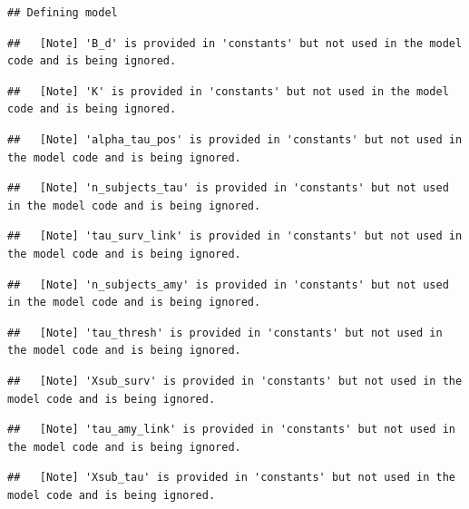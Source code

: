 \documentclass[
]{article}
\begin{document}
\begin{verbatim}
## Defining model
\end{verbatim}

\begin{verbatim}
##   [Note] 'B_d' is provided in 'constants' but not used in the model code and is being ignored.
\end{verbatim}

\begin{verbatim}
##   [Note] 'K' is provided in 'constants' but not used in the model code and is being ignored.
\end{verbatim}

\begin{verbatim}
##   [Note] 'alpha_tau_pos' is provided in 'constants' but not used in the model code and is being ignored.
\end{verbatim}

\begin{verbatim}
##   [Note] 'n_subjects_tau' is provided in 'constants' but not used in the model code and is being ignored.
\end{verbatim}

\begin{verbatim}
##   [Note] 'tau_surv_link' is provided in 'constants' but not used in the model code and is being ignored.
\end{verbatim}

\begin{verbatim}
##   [Note] 'n_subjects_amy' is provided in 'constants' but not used in the model code and is being ignored.
\end{verbatim}

\begin{verbatim}
##   [Note] 'tau_thresh' is provided in 'constants' but not used in the model code and is being ignored.
\end{verbatim}

\begin{verbatim}
##   [Note] 'Xsub_surv' is provided in 'constants' but not used in the model code and is being ignored.
\end{verbatim}

\begin{verbatim}
##   [Note] 'tau_amy_link' is provided in 'constants' but not used in the model code and is being ignored.
\end{verbatim}

\begin{verbatim}
##   [Note] 'Xsub_tau' is provided in 'constants' but not used in the model code and is being ignored.
\end{verbatim}
\end{document}
